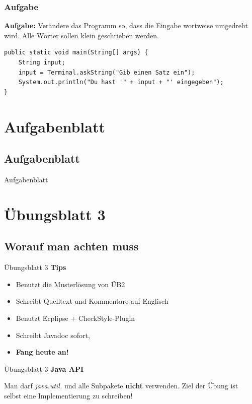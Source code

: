 \documentclass[18pt]{beamer}
\begin{document}
\begin{frame}[containsverbatim]
	\frametitle{{Aufgabe}}
	\textbf{Aufgabe:} Verändere das Programm so, dass die Eingabe wortweise umgedreht wird. Alle Wörter sollen klein geschrieben werden.
	\begin{lstlisting}
public static void main(String[] args) {
	String input;
	input = Terminal.askString("Gib einen Satz ein");
	System.out.println("Du hast '" + input + "' eingegeben");
}
	\end{lstlisting}
\end{frame}

\section{Aufgabenblatt}
\subsection{Aufgabenblatt}
\begin{frame}{Aufgabenblatt}
\end{frame}

\section{Übungsblatt 3}
\subsection{Worauf man achten muss}
\begin{frame}{Übungsblatt 3}
	\textbf{Tips}
	
	\begin{itemize}
		\item Benutzt die Musterlösung von ÜB2 \pause
		\item Schreibt Quelltext und Kommentare auf Englisch \pause
		\item Benutzt Ecplipse + CheckStyle-Plugin \pause
		\item Schreibt Javadoc sofort, \pause
		\item \textbf{Fang heute an!}
	\end{itemize}

\end{frame}

\begin{frame}{Übungsblatt 3}
	\textbf{Java API}
	
	Man darf \emph{java.util.} und alle Subpakete \textbf{nicht} verwenden. Ziel der Übung ist selbst eine Implementierung zu schreiben!

\end{frame}
\end{document}
